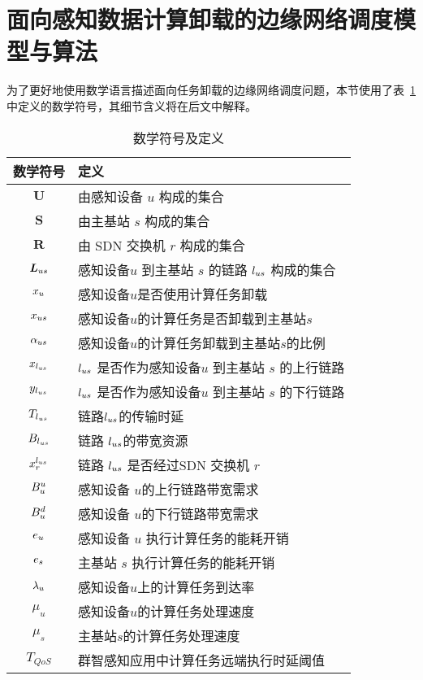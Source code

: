 

\section{面向感知数据计算卸载的边缘网络调度模型与算法}

为了更好地使用数学语言描述面向任务卸载的边缘网络调度问题，本节使用了表~\ref{table_notations_ispa} 中定义的数学符号，其细节含义将在后文中解释。

\begin{table}[!h]
  \caption{数学符号及定义}
  \vspace{-1em}
  \label{table_notations_ispa}
  \centering
  \begin{tabular}{|c|p{8cm}|}
    \hline
    \textbf{数学符号} & \textbf{定义}\\
    \hline
    $\boldsymbol{U}$ & 由感知设备 $u$ 构成的集合\\\hline
    $\boldsymbol{S}$ & 由主基站 $s$ 构成的集合\\\hline
    $\boldsymbol{R}$ & 由 SDN 交换机 $r$ 构成的集合\\\hline
    $\boldsymbol{L}_{us}$ & 感知设备$u$ 到主基站 $s$ 的链路 $l_{us}$ 构成的集合\\\hline
    ${x}_{u}$ & 感知设备$u$是否使用计算任务卸载\\\hline
    ${x}_{us}$ & 感知设备$u$的计算任务是否卸载到主基站$s$\\\hline
    ${\alpha}_{us}$ & 感知设备$u$的计算任务卸载到主基站$s$的比例\\\hline
    $x_{l_{us}}$ & $l_{us}$ 是否作为感知设备$u$ 到主基站 $s$ 的上行链路\\\hline
    $y_{l_{us}}$ & $l_{us}$ 是否作为感知设备$u$ 到主基站 $s$ 的下行链路\\\hline
    $T_{l_{us}}$ & 链路$l_{us}$的传输时延\\\hline
    $B_{l_{us}}$ & 链路 $l_{us}$的带宽资源\\\hline
    $x^{l_{us}}_{r}$ & 链路 $l_{us}$ 是否经过SDN 交换机 $r$\\\hline
    $B^{u}_u$ & 感知设备 $u$的上行链路带宽需求\\\hline
    $B^{d}_u$ & 感知设备 $u$的下行链路带宽需求\\\hline
    $e_u$ & 感知设备 $u$ 执行计算任务的能耗开销\\\hline
    $e_s$ & 主基站 $s$ 执行计算任务的能耗开销\\\hline
    ${\lambda}_{u}$ & 感知设备$u$上的计算任务到达率\\\hline
    $\mu_u$ & 感知设备$u$的计算任务处理速度\\\hline
    $\mu_s$ & 主基站$s$的计算任务处理速度\\\hline
    $T_{QoS}$ & 群智感知应用中计算任务远端执行时延阈值 \\\hline
  \end{tabular}
\end{table}

